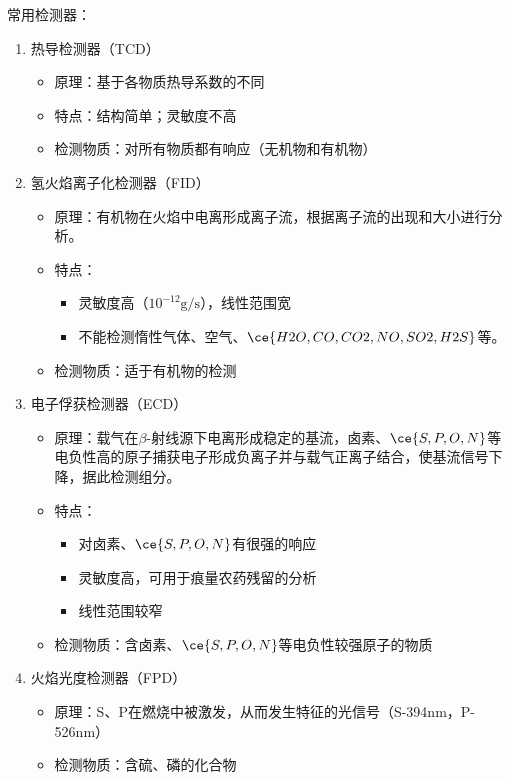常用检测器：
\begin{enumerate}
	\item 热导检测器（TCD）
	\begin{itemize}
		\item 原理：基于各物质热导系数的不同
		\item 特点：结构简单；灵敏度不高
		\item 检测物质：对所有物质都有响应（无机物和有机物）
	\end{itemize}
	\item 氢火焰离子化检测器（FID）
	\begin{itemize}
		\item 原理：有机物在火焰中电离形成离子流，根据离子流的出现和大小进行分析。
		\item 特点：
		\begin{itemize}
			\item 灵敏度高（$10^{-12}\mathrm{g/s}$），线性范围宽
			\item 不能检测惰性气体、空气、$\ce{H2O,CO,CO2,NO,SO2,H2S}$等。
		\end{itemize}
		\item 检测物质：适于有机物的检测
	\end{itemize}
	\item 电子俘获检测器（ECD）
	\begin{itemize}
		\item 原理：载气在$\beta$-射线源下电离形成稳定的基流，卤素、$\ce{S,P,O,N}$等电负性高的原子捕获电子形成负离子并与载气正离子结合，使基流信号下降，据此检测组分。
		\item 特点：
		\begin{itemize}
			\item 对卤素、$\ce{S,P,O,N}$有很强的响应
			\item 灵敏度高，可用于痕量农药残留的分析
			\item 线性范围较窄
		\end{itemize}
		\item 检测物质：含卤素、$\ce{S,P,O,N}$等电负性较强原子的物质
	\end{itemize}
	\item 火焰光度检测器（FPD）
	\begin{itemize}
		\item 原理：S、P在燃烧中被激发，从而发生特征的光信号（S-394nm，P-526nm）	
		\item 检测物质：含硫、磷的化合物
	\end{itemize}
\end{enumerate}

